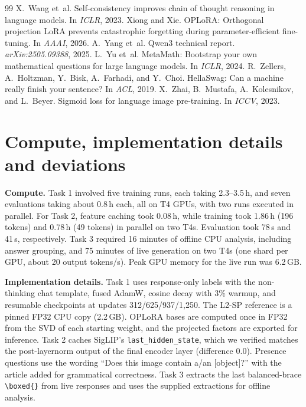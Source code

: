 \documentclass{article}
\begin{document}
\begin{thebibliography}{99}
 X.~Wang et~al. Self-consistency improves chain of thought reasoning in language models. In \emph{ICLR}, 2023.
 Xiong and Xie. OPLoRA: Orthogonal projection LoRA prevents catastrophic forgetting during parameter-efficient fine-tuning. In \emph{AAAI}, 2026.
 A.~Yang et~al. Qwen3 technical report. \emph{arXiv:2505.09388}, 2025.
 L.~Yu et~al. MetaMath: Bootstrap your own mathematical questions for large language models. In \emph{ICLR}, 2024.
 R.~Zellers, A.~Holtzman, Y.~Bisk, A.~Farhadi, and Y.~Choi. HellaSwag: Can a machine really finish your sentence? In \emph{ACL}, 2019.
 X.~Zhai, B.~Mustafa, A.~Kolesnikov, and L.~Beyer. Sigmoid loss for language image pre-training. In \emph{ICCV}, 2023.
\end{thebibliography}

\appendix
\raggedbottom
\setlength{\intextsep}{8pt plus 2pt minus 2pt}

\section{Compute, implementation details and deviations}
\label{app:compute}


\textbf{Compute.} Task 1 involved five training runs, each taking 2.3--3.5\,h, and seven evaluations taking about 0.8\,h each, all on T4 GPUs, with two runs executed in parallel. For Task 2, feature caching took 0.08\,h, while training took 1.86\,h (196 tokens) and 0.78\,h (49 tokens) in parallel on two T4s. Evaluation took 78\,s and 41\,s, respectively. Task 3 required 16 minutes of offline CPU analysis, including answer grouping, and 75 minutes of live generation on two T4s (one shard per GPU, about 20 output tokens/s). Peak GPU memory for the live run was 6.2\,GB.

\textbf{Implementation details.} Task 1 uses response-only labels with the non-thinking chat template, fused AdamW, cosine decay with 3\% warmup, and resumable checkpoints at updates 312/625/937/1,250. The L2-SP reference is a pinned FP32 CPU copy (2.2\,GB). OPLoRA bases are computed once in FP32 from the SVD of each starting weight, and the projected factors are exported for inference. Task 2 caches SigLIP's \texttt{last\_hidden\_state}, which we verified matches the post-layernorm output of the final encoder layer (difference 0.0). Presence questions use the wording ``Does this image contain a/an [object]?'' with the article added for grammatical correctness. Task 3 extracts the last balanced-brace \texttt{\textbackslash boxed\{\}} from live responses and uses the supplied extractions for offline analysis.
\end{document}
